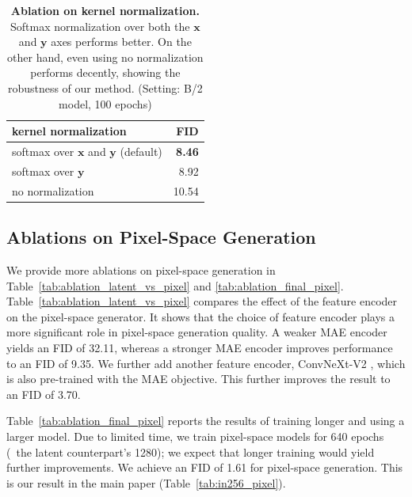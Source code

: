 \documentclass{article}
\newcommand{\tablestyle}[2]{\setlength{\tabcolsep}{#1}\renewcommand{\arraystretch}{#2}\centering
\small
}
\newcommand\tablefontsize{%
  \fontsize{8pt}{9pt}\selectfont
}
\newcommand{\vv}[1]{\mathbf{#1}}
\newcommand{\x}{\vv{x}}
\newcommand{\y}{\vv{y}}
\theoremstyle{plain}
\theoremstyle{definition}
\theoremstyle{remark}
\begin{document}
\renewcommand{\topfraction}{0.95}
\renewcommand{\bottomfraction}{0.95}
\renewcommand{\textfraction}{0.05}
\renewcommand{\floatpagefraction}{0.9}

\begin{table}[t]
    \centering
    \caption{\textbf{Ablation on kernel normalization.}
    Softmax normalization over both the $\x$ and $\y$ axes performs better. On the other hand, even using no normalization performs decently, showing the robustness of our method.
    (Setting: B/2 model, 100 epochs)
    }
    \label{tab:kernel_normalization}
    \tablestyle{6pt}{1.0}
    \tablefontsize
    \begin{tabular}{l r}
    \toprule
    kernel normalization & FID \\
    \midrule
    softmax over $\x$ and $\y$ (default) & \textbf{8.46} \\
    softmax over $\y$ & 8.92 \\
    no normalization & 10.54 \\
    \bottomrule
    \end{tabular}
    \vspace{-.5em}
\end{table}

\subsection{Ablations on Pixel-Space Generation}
\label{section:exp_pixel_space}

We provide more ablations on pixel-space generation in Table~\ref{tab:ablation_latent_vs_pixel} and \ref{tab:ablation_final_pixel}.
Table~\ref{tab:ablation_latent_vs_pixel} compares the effect of the feature encoder on the pixel-space generator.
It shows that the choice of feature encoder plays a more significant role in pixel-space generation quality.
A weaker MAE encoder yields an FID of 32.11, whereas a stronger MAE encoder improves performance to an FID of 9.35.
We further add another feature encoder, ConvNeXt-V2 \cite{woo2023convnext}, which is also pre-trained with the MAE objective. This further improves the result to an FID of 3.70.

Table~\ref{tab:ablation_final_pixel} reports the results of training longer and using a larger model. Due to limited time, we train pixel-space models for 640 epochs (\vs~the latent counterpart's 1280); we expect that longer training would yield further improvements.
We achieve an FID of 1.61 for pixel-space generation. This is our result in the main paper (Table~\ref{tab:in256_pixel}).
\end{document}
